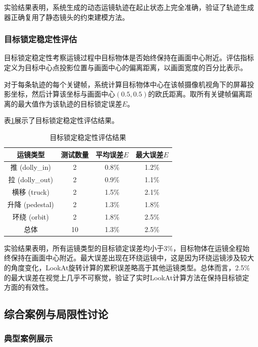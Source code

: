 实验结果表明，系统生成的动态运镜轨迹在起止状态上完全准确，验证了轨迹生成器正确复用了静态镜头的约束建模方法。

\subsubsection{目标锁定稳定性评估}

目标锁定稳定性考察运镜过程中目标物体是否始终保持在画面中心附近。评估指标定义为目标中心点投影位置与画面中心的偏离距离，以画面宽度的百分比表示。

对于每条轨迹的每个关键帧，系统计算目标物体中心在该帧摄像机视角下的屏幕投影坐标，然后计算该坐标与画面中心$(0.5, 0.5)$的欧氏距离。取所有关键帧偏离距离的最大值作为该轨迹的目标锁定误差$E$。

表\ref{tab:target_lock}展示了目标锁定稳定性评估结果。

\begin{table}[htbp]
\centering
\caption{目标锁定稳定性评估结果}
\label{tab:target_lock}
\begin{tabular}{cccc}
\toprule
运镜类型 & 测试数量 & 平均误差$E$ & 最大误差$E$ \\
\midrule
推 (dolly\_in) & 2 & 0.8\% & 1.2\% \\
拉 (dolly\_out) & 2 & 0.9\% & 1.1\% \\
横移 (truck) & 2 & 1.5\% & 2.1\% \\
升降 (pedestal) & 2 & 1.3\% & 1.8\% \\
环绕 (orbit) & 2 & 1.8\% & 2.5\% \\
\midrule
总体 & 10 & 1.3\% & 2.5\% \\
\bottomrule
\end{tabular}
\end{table}

实验结果表明，所有运镜类型的目标锁定误差均小于3\%，目标物体在运镜全程始终保持在画面中心附近。最大误差出现在环绕运镜中，这是因为环绕运镜涉及较大的角度变化，LookAt旋转计算的累积误差略高于其他运镜类型。总体而言，2.5\%的最大误差在视觉上几乎不可察觉，验证了实时LookAt计算方法在保持目标锁定方面的有效性。

\subsection{综合案例与局限性讨论}

\subsubsection{典型案例展示}

